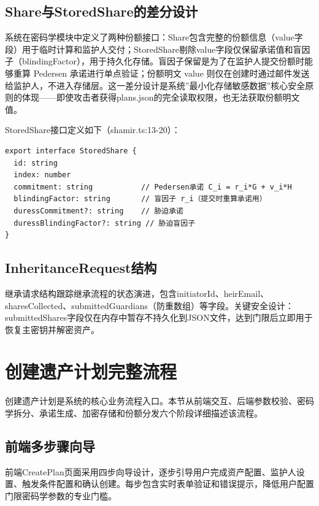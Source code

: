 \documentclass[UTF8,a4paper,zihao=-4,openany]{ctexrep}
\begin{document}
\subsection{Share与StoredShare的差分设计}

系统在密码学模块中定义了两种份额接口：Share包含完整的份额信息（value字段）用于临时计算和监护人交付；StoredShare剔除value字段仅保留承诺值和盲因子（blindingFactor），用于持久化存储。盲因子保留是为了在监护人提交份额时能够重算 Pedersen 承诺进行单点验证；份额明文 value 则仅在创建时通过邮件发送给监护人，不进入存储层。这一差分设计是系统”最小化存储敏感数据”核心安全原则的体现——即使攻击者获得plans.json的完全读取权限，也无法获取份额明文值。

StoredShare接口定义如下（shamir.ts:13-20）：

\begin{lstlisting}[caption={StoredShare安全份额结构 (shamir.ts:13-20)}]
export interface StoredShare {
  id: string
  index: number
  commitment: string           // Pedersen承诺 C_i = r_i*G + v_i*H
  blindingFactor: string       // 盲因子 r_i（提交时重算承诺用）
  duressCommitment?: string    // 胁迫承诺
  duressBlindingFactor?: string // 胁迫盲因子
}
\end{lstlisting}

\subsection{InheritanceRequest结构}

继承请求结构跟踪继承流程的状态演进，包含initiatorId、heirEmail、sharesCollected、submittedGuardians（防重数组）等字段。关键安全设计：submittedShares字段仅在内存中暂存不持久化到JSON文件，达到门限后立即用于恢复主密钥并解密资产。

\section{创建遗产计划完整流程}

创建遗产计划是系统的核心业务流程入口。本节从前端交互、后端参数校验、密码学拆分、承诺生成、加密存储和份额分发六个阶段详细描述该流程。

\subsection{前端多步骤向导}

前端CreatePlan页面采用四步向导设计，逐步引导用户完成资产配置、监护人设置、触发条件配置和确认创建。每步包含实时表单验证和错误提示，降低用户配置门限密码学参数的专业门槛。
\end{document}
